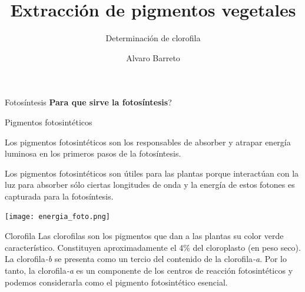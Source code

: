 \documentclass[12pt, aspectratio=169]{beamer}
\author{Alvaro Barreto}
\begin{document}
	
	\title{Extracci\'on de pigmentos vegetales}
	\subtitle{Determinaci\'on de clorofila}
	
	\begin{frame}[plain]
		\titlepage
	\end{frame}
	
	\begin{frame}{Fotos\'intesis}
		\textquestiondown \textbf{Para que sirve la fotos\'intesis}?
		
		
	\end{frame}
	
	\begin{frame}{Pigmentos fotosint\'eticos}
		
		Los pigmentos fotosintéticos son los responsables de absorber y atrapar energía luminosa en los primeros pasos de la fotosíntesis. %
		
		Los pigmentos fotosintéticos son útiles para las plantas porque interactúan con la luz para absorber sólo ciertas longitudes de onda y la energía de estos fotones es capturada para la fotosíntesis.
		
	\end{frame}

	\begin{frame}
			\texttt{[image: energia\_foto.png]}
		\centering
	\end{frame}

	\begin{frame}{Clorofila}
		Las clorofilas son los pigmentos que dan a las plantas su color verde caracter\'istico.
		Constituyen aproximadamente el 4\% del cloroplasto (en peso seco). La clorofila\textit{-b} se presenta como un tercio del contenido de la clorofila\textit{-a}. Por lo tanto, la clorofila\textit{-a} es un componente de los centros de reacción fotosintéticos y podemos considerarla como el pigmento fotosintético esencial. 
		
	\end{frame}
\end{document}
